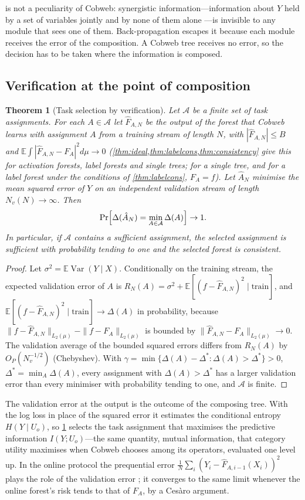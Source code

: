 \documentclass[11pt]{article}
\newtheorem{theorem}{Theorem}
\theoremstyle{definition}
\theoremstyle{remark}
\newcommand{\E}{\mathbb{E}}
\newcommand{\cA}{\mathcal{A}}
\newcommand{\Var}{\operatorname{Var}}
\begin{document}
 is not a peculiarity of Cobweb: synergistic information---information
about $Y$ held by a set of variables jointly and by none of them alone
\citep{williams2010}---is invisible to any module that sees one of them.  Back-propagation
escapes it because each module receives the error of the composition.  A Cobweb tree
receives no error, so the decision has to be taken where the information is composed.

\subsection{Verification at the point of composition}

\begin{theorem}[Task selection by verification]\label{thm:selection}
Let $\cA$ be a finite set of task assignments.  For each $A\in\cA$ let $\hat F_{A,N}$ be
the output of the forest that Cobweb learns with assignment $A$ from a training stream
of length $N$, with $|\hat F_{A,N}|\le B$ and $\E\int|\hat F_{A,N}-F_A|^2d\mu\to0$
(\cref{thm:ideal,thm:labelcons,thm:consistency} give this for activation forests, label
forests and single trees; for a single tree, and for a label forest under the conditions
of \cref{thm:labelcons}, $F_A=f$).  Let $\hat A_N$ minimise the mean squared error of $Y$ on an
independent validation stream of length $N_v(N)\to\infty$.  Then
\[
  \Pr\Bigl[\Delta(\hat A_N)=\min_{A\in\cA}\Delta(A)\Bigr]\to1.
\]
In particular, if $\cA$ contains a sufficient assignment, the selected assignment is
sufficient with probability tending to one and the selected forest is consistent.
\end{theorem}
\begin{proof}
Let $\sigma^2=\E\Var(Y\mid X)$.  Conditionally on the training stream, the expected
validation error of $A$ is
$R_N(A)=\sigma^2+\E[(f-\hat F_{A,N})^2\mid\text{train}]$, and
$\E[(f-\hat F_{A,N})^2\mid\text{train}]\to\Delta(A)$ in probability, because
$\|f-\hat F_{A,N}\|_{L_2(\mu)}-\|f-F_A\|_{L_2(\mu)}$ is bounded by
$\|\hat F_{A,N}-F_A\|_{L_2(\mu)}\to0$.  The validation average of the bounded squared
errors differs from $R_N(A)$ by $O_P(N_v^{-1/2})$ (Chebyshev).  With
$\gamma=\min\{\Delta(A)-\Delta^*:\Delta(A)>\Delta^*\}>0$, $\Delta^*=\min_A\Delta(A)$,
every assignment with $\Delta(A)>\Delta^*$ has a larger validation error than every
minimiser with probability tending to one, and $\cA$ is finite.
\end{proof}

The validation error at the output is the outcome of the composing tree.  With the log
loss in place of the squared error it estimates the conditional entropy
$H(Y\mid U_o)$, so \cref{thm:selection} selects the task assignment that maximises the
predictive information $I(Y;U_o)$---the same quantity, mutual information, that category
utility maximises when Cobweb chooses among its operators, evaluated one level up.  In
the online protocol the prequential error $\frac1N\sum_i(Y_i-\hat F_{A,i-1}(X_i))^2$
plays the role of the validation error \citep{dawid1984}; it converges to the same limit
whenever the online forest's risk tends to that of $F_A$, by a Ces\`aro argument.
\end{document}
